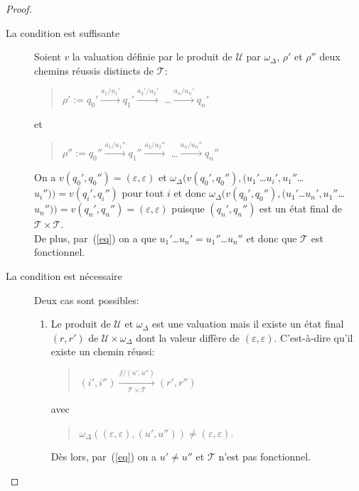 	\begin{proof}
		\begin{description}
			\item[La condition est suffisante]
				Soient $v$ la valuation définie par le produit de $\mathscr{U}$ par $\omega_\Delta$, $\rho'$ et $\rho''$ deux chemins réussis distincts de $\mathscr{T}$:
				\begin{quotation}
					$\rho' := q_0' \xrightarrow{a_1/u_1'} q_1' \xrightarrow{a_2'/u_2'}$ \ldots $\xrightarrow{a_n/u_n'} q_n'$
				\end{quotation}
				et
				\begin{quotation}
					$\rho'' := q_0'' \xrightarrow{a_1/u_1''} q_1'' \xrightarrow{a_2/u_2''}$ \ldots $\xrightarrow{a_n/u_n''} q_n''$
				\end{quotation}
				
				On a $v(q_0',q_0'') = (\varepsilon,\varepsilon)$ et $\omega_\Delta(v(q_0',q_0''), (u_1'$\ldots $u_i',u_1''$\ldots $u_i'')) = v(q_i',q_i'')$ pour tout $i$ et donc $\omega_\Delta(v(q_0',q_0''), (u_1'$\ldots $u_n',u_1''$\ldots $u_n'')) = v(q_n',q_n'') = (\varepsilon,\varepsilon)$ puisque $(q_n',q_n'')$ est un état final de $\mathscr{T} \times \mathscr{T}$. \\
				De plus, par~(\ref{eq}) on a que $u_1'$\ldots$u_n' = u_1''$\ldots$u_n''$ et donc que $\mathscr{T}$ est fonctionnel.
				
			\item[La condition est nécessaire]
				Deux cas sont possibles:
				\begin{enumerate}
					\item Le produit de $\mathscr{U}$ et $\omega_\Delta$ est une valuation mais il existe un état final $(r, r')$ de $\mathscr{U} \times \omega_\Delta$ dont la valeur diffère de $(\varepsilon, \varepsilon)$. C'est-à-dire qu'il existe un chemin réussi:
					\begin{quotation}
						$(i',i'') \xrightarrow[\mathscr{T} \times \mathscr{T}]{f/(u',u'')}(r',r'')$
					\end{quotation}
					avec
					\begin{quotation}
						$\omega_\Delta((\varepsilon,\varepsilon), (u',u'')) \neq (\varepsilon,\varepsilon)$.
					\end{quotation}
					
					Dès lors, par~(\ref{eq}) on a $u' \neq u''$ et $\mathscr{T}$ n'est pas fonctionnel.
					

\end{enumerate}
\end{description}
\end{proof}
